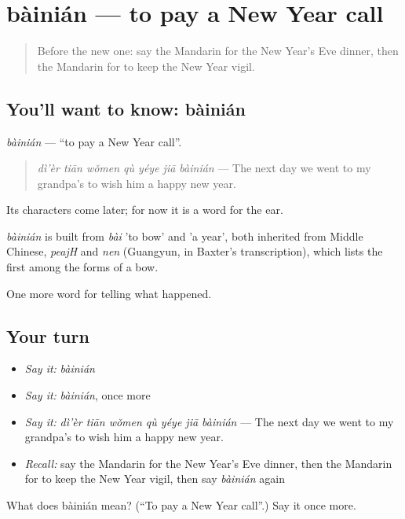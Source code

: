 \section[bàinián]{bàinián — to pay a New Year call}

\label{lesson:ZH-C333-bainian}



\begin{quote}
Before the new one: say the Mandarin for the New Year's Eve dinner, then the Mandarin for to keep the New Year vigil.
\end{quote}

\subsection*{You'll want to know: bàinián}
\emph{bàinián} — \textquotedblleft{}to pay a New Year call\textquotedblright{}.

\begin{quote}
\emph{dì'èr tiān wǒmen qù yéye jiā bàinián} — The next day we went to my grandpa's to wish him a happy new year.
\end{quote}

Its characters come later; for now it is a word for the ear.

\begin{cousinweb}
\emph{bàinián} is built from \emph{bài} 'to bow' and  'a year', both inherited from Middle Chinese, \emph{peajH} and \emph{nen} (Guangyun, in Baxter's transcription), which lists the first among the forms of a bow.
\end{cousinweb}

\begin{grammarlens}[title={What you've built}]
One more word for telling what happened.
\end{grammarlens}

\subsection*{Your turn}
\begin{itemize}
\raggedright
  \item \emph{Say it:} \emph{bàinián}
  \item \emph{Say it:} \emph{bàinián}, once more
  \item \emph{Say it:} \emph{dì'èr tiān wǒmen qù yéye jiā bàinián} — The next day we went to my grandpa's to wish him a happy new year.
  \item \emph{Recall:} say the Mandarin for the New Year's Eve dinner, then the Mandarin for to keep the New Year vigil, then say \emph{bàinián} again
\end{itemize}

\begin{tcolorbox}[breakable,colback=teal!4,colframe=teal!35!black,title={Before you move on}]
What does bàinián mean? (\textquotedblleft{}To pay a New Year call\textquotedblright{}.) Say it once more.
\end{tcolorbox}
